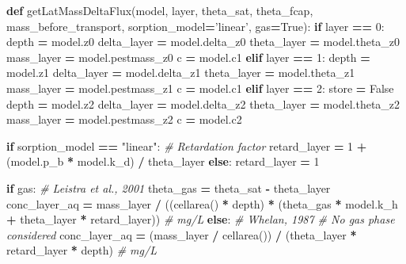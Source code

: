 \documentclass[]{article}
\newenvironment{Shaded}{\begin{snugshade}}{\end{snugshade}}
\newcommand{\KeywordTok}[1]{\textcolor[rgb]{0.13,0.29,0.53}{\textbf{{#1}}}}
\newcommand{\DecValTok}[1]{\textcolor[rgb]{0.00,0.00,0.81}{{#1}}}
\newcommand{\StringTok}[1]{\textcolor[rgb]{0.31,0.60,0.02}{{#1}}}
\newcommand{\CommentTok}[1]{\textcolor[rgb]{0.56,0.35,0.01}{\textit{{#1}}}}
\newcommand{\VariableTok}[1]{\textcolor[rgb]{0.00,0.00,0.00}{{#1}}}
\newcommand{\ControlFlowTok}[1]{\textcolor[rgb]{0.13,0.29,0.53}{\textbf{{#1}}}}
\newcommand{\OperatorTok}[1]{\textcolor[rgb]{0.81,0.36,0.00}{\textbf{{#1}}}}
\newcommand{\NormalTok}[1]{{#1}}
\begin{document}
\begin{Shaded}
\begin{Highlighting}[]

\KeywordTok{def} \NormalTok{getLatMassDeltaFlux(model, layer, theta_sat, theta_fcap,}
                        \NormalTok{mass_before_transport, sorption_model}\OperatorTok{=}\StringTok{'linear'}\NormalTok{, gas}\OperatorTok{=}\VariableTok{True}\NormalTok{):}
    \ControlFlowTok{if} \NormalTok{layer }\OperatorTok{==} \DecValTok{0}\NormalTok{:}
        \NormalTok{depth }\OperatorTok{=} \NormalTok{model.z0}
        \NormalTok{delta_layer }\OperatorTok{=} \NormalTok{model.delta_z0}
        \NormalTok{theta_layer }\OperatorTok{=} \NormalTok{model.theta_z0}
        \NormalTok{mass_layer }\OperatorTok{=} \NormalTok{model.pestmass_z0}
        \NormalTok{c }\OperatorTok{=} \NormalTok{model.c1}
    \ControlFlowTok{elif} \NormalTok{layer }\OperatorTok{==} \DecValTok{1}\NormalTok{:}
        \NormalTok{depth }\OperatorTok{=} \NormalTok{model.z1}
        \NormalTok{delta_layer }\OperatorTok{=} \NormalTok{model.delta_z1}
        \NormalTok{theta_layer }\OperatorTok{=} \NormalTok{model.theta_z1}
        \NormalTok{mass_layer }\OperatorTok{=} \NormalTok{model.pestmass_z1}
        \NormalTok{c }\OperatorTok{=} \NormalTok{model.c1}
    \ControlFlowTok{elif} \NormalTok{layer }\OperatorTok{==} \DecValTok{2}\NormalTok{:}
        \NormalTok{store }\OperatorTok{=} \VariableTok{False}
        \NormalTok{depth }\OperatorTok{=} \NormalTok{model.z2}
        \NormalTok{delta_layer }\OperatorTok{=} \NormalTok{model.delta_z2}
        \NormalTok{theta_layer }\OperatorTok{=} \NormalTok{model.theta_z2}
        \NormalTok{mass_layer }\OperatorTok{=} \NormalTok{model.pestmass_z2}
        \NormalTok{c }\OperatorTok{=} \NormalTok{model.c2}

    \ControlFlowTok{if} \NormalTok{sorption_model }\OperatorTok{==} \StringTok{"linear"}\NormalTok{:}
        \CommentTok{# Retardation factor}
        \NormalTok{retard_layer }\OperatorTok{=} \DecValTok{1} \OperatorTok{+} \NormalTok{(model.p_b }\OperatorTok{*} \NormalTok{model.k_d) }\OperatorTok{/} \NormalTok{theta_layer}
    \ControlFlowTok{else}\NormalTok{:}
        \NormalTok{retard_layer }\OperatorTok{=} \DecValTok{1}

    \ControlFlowTok{if} \NormalTok{gas:}
        \CommentTok{# Leistra et al., 2001}
        \NormalTok{theta_gas }\OperatorTok{=} \NormalTok{theta_sat }\OperatorTok{-} \NormalTok{theta_layer}
        \NormalTok{conc_layer_aq }\OperatorTok{=} \NormalTok{mass_layer }\OperatorTok{/} \NormalTok{((cellarea() }\OperatorTok{*} \NormalTok{depth) }\OperatorTok{*}
                                      \NormalTok{(theta_gas }\OperatorTok{*} \NormalTok{model.k_h }\OperatorTok{+} \NormalTok{theta_layer }\OperatorTok{*} \NormalTok{retard_layer))  }\CommentTok{# mg/L}
    \ControlFlowTok{else}\NormalTok{:}
        \CommentTok{# Whelan, 1987 # No gas phase considered}
        \NormalTok{conc_layer_aq }\OperatorTok{=} \NormalTok{(mass_layer }\OperatorTok{/} \NormalTok{cellarea()) }\OperatorTok{/} \NormalTok{(theta_layer }\OperatorTok{*} \NormalTok{retard_layer }\OperatorTok{*} \NormalTok{depth)  }\CommentTok{# mg/L}


\end{Highlighting}
\end{Shaded}
\end{document}
